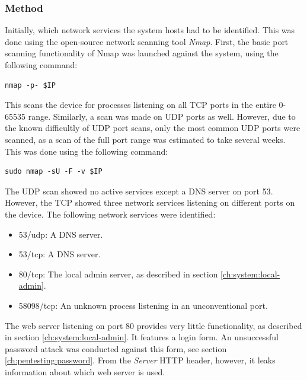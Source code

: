 \subsubsection{Method}
Initially, which network services the system hosts had to be identified. This was done using the open-source network scanning tool \textit{Nmap}. First, the basic port scanning functionality of Nmap was launched against the system, using the following command:
\begin{lstlisting}[frame=tb]
    nmap -p- $IP
\end{lstlisting}
This scans the device for processes listening on all TCP ports in the entire 0-65535 range. Similarly, a scan was made on UDP ports as well. However, due to the known difficultly of UDP port scans, only the most common UDP ports were scanned, as a scan of the full port range was estimated to take several weeks. This was done using the following command:
\begin{lstlisting}[frame=tb]
    sudo nmap -sU -F -v $IP
\end{lstlisting}
The UDP scan showed no active services except a DNS server on port 53. However, the TCP showed three network services listening on different ports on the device. The following network services were identified:
\begin{itemize}
    \item 53/udp: A DNS server.
    \item 53/tcp: A DNS server.
    \item 80/tcp: The local admin server, as described in section \ref{ch:system:local-admin}.
    \item 58098/tcp: An unknown process listening in an unconventional port.
\end{itemize}
The web server listening on port 80 provides very little functionality, as described in section \ref{ch:system:local-admin}. It features a login form. An unsuccessful password attack was conducted against this form, see section \ref{ch:pentesting:password}. From the \textit{Server} HTTP header, however, it leaks information about which web server is used.

